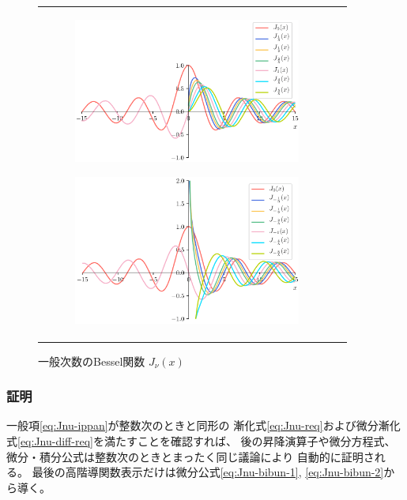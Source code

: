 \documentclass[../main/main]{subfiles}
\begin{document}
\begin{figure}[tb]
\begin{tabular}{cc}
\hspace{-24pt}
 \begin{minipage}{0.50\hsize}\small
    \begin{figure}[H]
      \centering
      \includegraphics[width=75mm]{../fig/bessel/bessel_nu.png}
    \end{figure}
 \end{minipage}

 \begin{minipage}{0.50\hsize}
    \begin{figure}[H]
      \centering
      \includegraphics[width=75mm]{../fig/bessel/bessel_nu_minus.png}
    \end{figure}
 \end{minipage}
\end{tabular}
\caption{	一般次数のBessel関数 $J_\nu(x)$}
\end{figure}




\subsubsection*{証明}

一般項\eqref{eq:Jnu-ippan}が整数次のときと同形の
漸化式\eqref{eq:Jnu-req}および微分漸化式\eqref{eq:Jnu-diff-req}を満たすことを確認すれば、
後の昇降演算子や微分方程式、微分・積分公式は整数次のときとまったく同じ議論により
自動的に証明される。
最後の高階導関数表示だけは微分公式\eqref{eq:Jnu-bibun-1}, \eqref{eq:Jnu-bibun-2}から導く。
\end{document}
